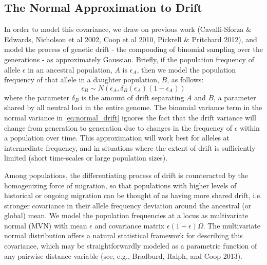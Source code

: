 \documentclass[12pt]{article}
\begin{document}
\subsection*{The Normal Approximation to Drift}
In order to model this covariance, we draw on previous work (Cavalli-Sforza \& Edwards, Nicholson et al 2002, Coop et al 2010, Pickrell \& Pritchard 2012), and model the process of genetic drift - the compouding of binomial sampling over the generations - as approximately Gaussian.  Briefly, if the population frequency of allele $\epsilon$ in an ancestral population, $A$ is $\epsilon_A$, then we model the population frequency of that allele in a daughter population,  $B$, as follows:
\begin{equation}
\label{eq:normal_drift}
\epsilon_B \sim N(\epsilon_A,\delta_B(\epsilon_A)(1-\epsilon_A))
\end{equation}
where the parameter  $\delta_B$ is the amount of drift separating $A$ and $B$, a parameter shared by all neutral loci in the entire genome.  The binomial variance term in the normal variance in \eqref{eq:normal_drift} ignores the fact that the drift variance will change from generation to generation due to changes in the frequency of $\epsilon$ within a population over time.  This approximation will work best for alleles at intermediate frequency, and in situations where the extent of drift is sufficiently limited (short time-scales or large population sizes). 

Among populations, the differentiating process of drift is counteracted by the homogenizing force of migration, so that populations with higher levels of historical or ongoing migration can be thought of as having more shared drift, i.e. stronger covariance in their allele frequency deviation around the ancestral (or global) mean. We model the population frequencies at a locus as multivariate normal (MVN) with mean $\epsilon$ and covariance matrix $\epsilon (1-\epsilon)\Omega$. The multivariate normal distribution offers a natural statistical framework for describing this covariance, which may be straightforwardly modeled as a parametric function of any pairwise distance variable (see, e.g., Bradburd, Ralph, and Coop 2013). 


\end{document}
